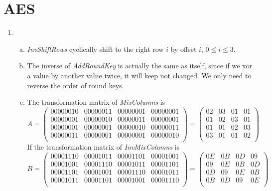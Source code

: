 \documentclass{article}
\begin{document}
\section{AES}
\begin{enumerate}
\item
\begin{enumerate}[(a)]
\item
\emph{InvShiftRows} cyclically shift to the right row $i$ by offset $i$, $0\leqslant i\leqslant3$.
\item
The inverse of \emph{AddRoundKey} is actually the same as itself, since if we xor a value by another value twice, it will keep not changed. We only need to reverse the order of round keys.
\item
The transformation matrix of \emph{MixColumns} is 
$$A=\begin{pmatrix}
00000010 & 00000011 & 00000001 & 00000001 \\
00000001 & 00000010 & 00000011 & 00000001 \\
00000001 & 00000001 & 00000010 & 00000011 \\
00000011 & 00000001 & 00000001 & 00000010 \\
\end{pmatrix}=\begin{pmatrix}
02 & 03 & 01 & 01 \\
01 & 02 & 03 & 01 \\
01 & 01 & 02 & 03 \\
03 & 01 & 01 & 02 \\
\end{pmatrix}$$
If the transformation matrix of \emph{InvMixColumns} is 
$$B=\begin{pmatrix}
00001110 & 00001011 & 00001101 & 00001001 \\
00001001 & 00001110 & 00001011 & 00001101 \\
00001101 & 00001001 & 00001110 & 00001011 \\
00001011 & 00001101 & 00001001 & 00001110 \\
\end{pmatrix}=\begin{pmatrix}
0E & 0B & 0D & 09 \\
09 & 0E & 0B & 0D \\
0D & 09 & 0E & 0B \\
0B & 0D & 09 & 0E \\
\end{pmatrix}$$


\end{enumerate}
\end{enumerate}
\end{document}
